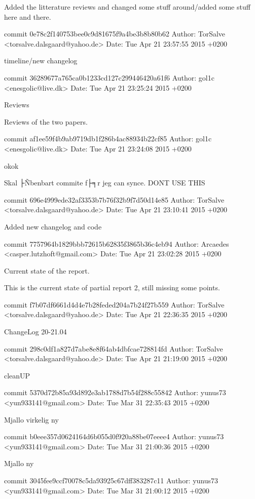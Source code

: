 \documentclass[12pt,a4paper]{article}
\begin{document}
Added the litterature reviews and changed some stuff around/added some
stuff here and there.

commit 0e78c2f140753bee0c9d81675f9a4be3b8b80b62
Author: TorSalve <torsalve.dalsgaard@yahoo.de>
Date:   Tue Apr 21 23:57:55 2015 +0200

timeline/new changelog

commit 36289677a765ca0b1233cd127c299446420a61f6
Author: gol1c <enesgolic@live.dk>
Date:   Tue Apr 21 23:25:24 2015 +0200

Reviews

Reviews of the two papers.

commit af1ee59f4b9ab9719db1f286b4ac88934b22cf85
Author: gol1c <enesgolic@live.dk>
Date:   Tue Apr 21 23:24:08 2015 +0200

okok

Skal ├Ñbenbart commite f├╕r jeg can synce. DONT USE THIS

commit 696e4999ede32af3353b7b76f32b9f7d50d14e85
Author: TorSalve <torsalve.dalsgaard@yahoo.de>
Date:   Tue Apr 21 23:10:41 2015 +0200

Added new changelog and code

commit 7757964b1829bbb72615b62835f3865b36c4eb94
Author: Arcaedes <casper.lutzhoft@gmail.com>
Date:   Tue Apr 21 23:02:28 2015 +0200

Current state of the report.

This is the current state of partial report 2, still missing some
points.

commit f7b07df6661d4d4e7b28feded204a7b24f27b559
Author: TorSalve <torsalve.dalsgaard@yahoo.de>
Date:   Tue Apr 21 22:36:35 2015 +0200

ChangeLog 20-21.04

commit 298c0df1a827d7abe8e8f64ab4dbfcae728814fd
Author: TorSalve <torsalve.dalsgaard@yahoo.de>
Date:   Tue Apr 21 21:19:00 2015 +0200

cleanUP

commit 5370d72b85a93d892e3ab1788d7b54f288c55842
Author: yunus73 <yun933141@gmail.com>
Date:   Tue Mar 31 22:35:43 2015 +0200

Mjallo virkelig ny

commit b0eee357d0624164d6b055d0f920a88be07eeee4
Author: yunus73 <yun933141@gmail.com>
Date:   Tue Mar 31 21:00:36 2015 +0200

Mjallo ny

commit 3045fee9ccf70078c5da93925c67dff383287c11
Author: yunus73 <yun933141@gmail.com>
Date:   Tue Mar 31 21:00:12 2015 +0200
\end{document}
